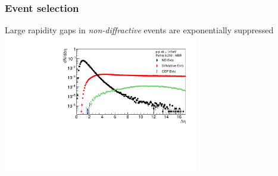 \documentclass{beamer}
\begin{document}

\begin{frame}
    \frametitle{Event selection}
    Large rapidity gaps in \emph{non-diffractive} events are exponentially suppressed
    \centering\includegraphics[height=6cm,keepaspectratio]{pics/newDeltaEta_biggerSymbols.pdf}
\end{frame}

\end{document}

